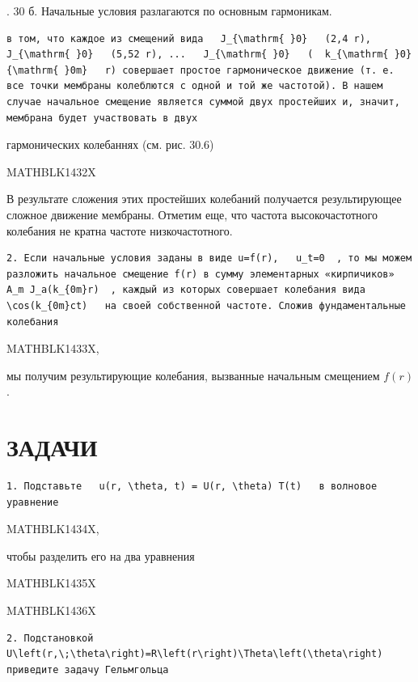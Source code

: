\documentclass[
]{article}
\begin{document}
. 30 б. Начальные условия разлагаются по основным гармоникам.

\begin{verbatim}
в том, что каждое из смещений вида   J_{\mathrm{ }0}   (2,4 r),   J_{\mathrm{ }0}   (5,52 r), ...   J_{\mathrm{ }0}   (  k_{\mathrm{ }0} {\mathrm{ }0m}   r) совершает простое гармоническое движение (т. е. все точки мембраны колеблются с одной и той же частотой). В нашем случае начальное смещение является суммой двух простейших и, значит, мембрана будет участвовать в двух
\end{verbatim}

гармонических колебаннях (см. рис. 30.6)

MATHBLK1432X

В результате сложения этих простейших колебаний получается
результирующее сложное движение мембраны. Отметим еще, что частота
высокочастотного колебания не кратна частоте низкочастотного.

\begin{verbatim}
2. Если начальные условия заданы в виде u=f(r),   u_t=0  , то мы можем разложить начальное смещение f(r) в сумму элементарных «кирпичиков»   A_m J_a(k_{0m}r)  , каждый из которых совершает колебания вида   \cos(k_{0m}ct)   на своей собственной частоте. Сложив фундаментальные колебания
\end{verbatim}

MATHBLK1433X,

мы получим результирующие колебания, вызванные начальным смещением
\(f(r)\).

\section{ЗАДАЧИ}\label{ux437ux430ux434ux430ux447ux438-11}

\begin{verbatim}
1. Подставьте   u(r, \theta, t) = U(r, \theta) T(t)   в волновое уравнение
\end{verbatim}

MATHBLK1434X,

чтобы разделить его на два уравнения

MATHBLK1435X

MATHBLK1436X

\begin{verbatim}
2. Подстановкой   U\left(r,\;\theta\right)=R\left(r\right)\Theta\left(\theta\right)   приведите задачу Гельмгольца
\end{verbatim}
\end{document}
